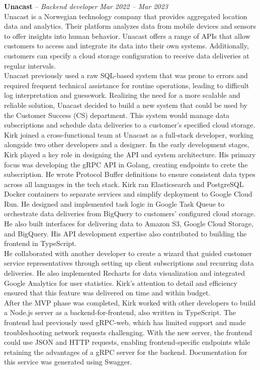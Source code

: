 \documentclass[10pt,letterpaper]{article}
\begin{document}
\headedsection
{\textbf{Unacast} -- \textit{Backend developer}}
{\textit{Mar 2022 -- Mar 2023}} { \\

	Unacast is a Norwegian technology company that provides aggregated location data and analytics. Their platform analyzes data from mobile devices and sensors to offer insights into human behavior. Unacast offers a range of APIs that allow customers to access and integrate its data into their own systems. Additionally, customers can specify a cloud storage configuration to receive data deliveries at regular intervals. \\

	Unacast previously used a raw SQL-based system that was prone to errors and required frequent technical assistance for routine operations, leading to difficult log interpretation and guesswork. Realizing the need for a more scalable and reliable solution, Unacast decided to build a new system that could be used by the Customer Success (CS) department. This system would manage data subscriptions and schedule data deliveries to a customer’s specified cloud storage. \\

	Kirk joined a cross-functional team at Unacast as a full-stack developer, working alongside two other developers and a designer. In the early development stages, Kirk played a key role in designing the API and system architecture. His primary focus was developing the gRPC API in Golang, creating endpoints to crete the subscription. He wrote Protocol Buffer definitions to ensure consistent data types across all languages in the tech stack. Kirk ran Elasticsearch and PostgreSQL Docker containers to separate services and simplify deployment to Google Cloud Run. He designed and implemented task logic in Google Task Queue to orchestrate data deliveries from BigQuery to customers' configured cloud storage. He also built interfaces for delivering data to Amazon S3, Google Cloud Storage, and BigQuery. His API development expertise also contributed to building the frontend in TypeScript. \\

	He collaborated with another developer to create a wizard that guided customer service representatives through setting up client subscriptions and recurring data deliveries. He also implemented Recharts for data visualization and integrated Google Analytics for user statistics. Kirk’s attention to detail and efficiency ensured that this feature was delivered on time and within budget. \\

	After the MVP phase was completed, Kirk worked with other developers to build a Node.js server as a backend-for-frontend, also written in TypeScript. The frontend had previously used gRPC-web, which has limited support and made troubleshooting network requests challenging. With the new server, the frontend could use JSON and HTTP requests, enabling frontend-specific endpoints while retaining the advantages of a gRPC server for the backend. Documentation for this service was generated using Swagger. \\
	}
\end{document}
